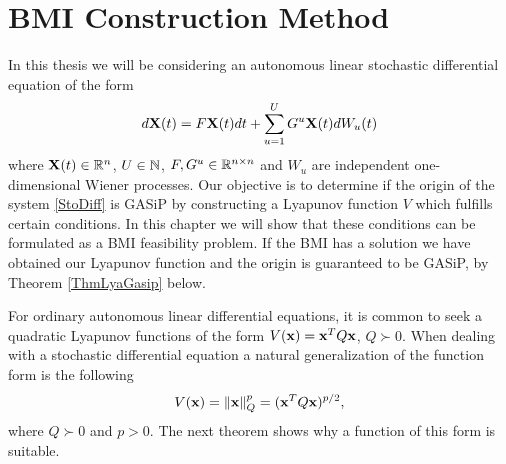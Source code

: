 \documentclass[a4paper,12pt,twoside,BCOR=10mm]{scrbook}
\begin{document}
\chapter{BMI Construction Method}\label{KafliBMIConstructionMethod}
In this thesis we will be considering an autonomous linear stochastic differential equation of the form
\begin{align}\label{StoDiff}
    d\mathbf{X}(t) = F\mathbf{X}(t)dt  + \sum_{u = 1}^UG^u\mathbf{X}(t) dW_u(t)
\end{align}
where $\mathbf{X}(t)\in\mathbb{R}^{n}$, $U\in\mathbb{N}$, $F, G^u\in \mathbb{R}^{n\times n}$ and $W_u$ are independent one-dimensional Wiener processes. Our objective is to determine if the origin of the system \eqref{StoDiff} is GASiP by constructing a Lyapunov function $V$ which fulfills certain conditions. In this chapter we will show that these conditions can be formulated as a BMI feasibility problem. If the BMI has a solution we have obtained our Lyapunov function and the origin is guaranteed to be GASiP, by Theorem \ref{ThmLyaGasip} below.

For ordinary autonomous linear differential equations, it is common to seek a quadratic Lyapunov functions of the form $V(\mathbf{x}) = \mathbf{x}^T Q\mathbf{x}$, $Q \succ 0$. When dealing with a stochastic differential equation a natural generalization of the function form is the following
\begin{align}\label{LyaForm}
    V(\mathbf{x}) = \left\lVert\mathbf{x}\right\rVert_Q^p = (\mathbf{x}^T Q \mathbf{x})^{p / 2},
\end{align}
where $Q \succ 0$ and $p > 0$. The next theorem shows why a function of this form is suitable.
\end{document}
